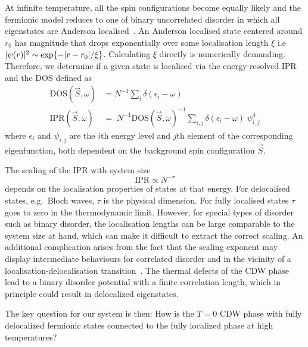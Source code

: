 At infinite temperature, all the spin configurations become equally likely and the fermionic model reduces to one of binary uncorrelated disorder in which all eigenstates are Anderson localised~\autocite{abrahamsScalingTheoryLocalization1979}. An Anderson localised state centered around \(r_0\) has magnitude that drops exponentially over some localisation length \(\xi\) i.e \(|\psi(r)|^2 \sim \exp{-\abs{r - r_0}/\xi}\). Calculating \(\xi\) directly is numerically demanding. Therefore, we determine if a given state is localised via the energy-resolved {IPR} and the {DOS} defined as \[\begin{aligned}
\mathrm{DOS}(\vec{S}, \omega)& = N^{-1} \sum_{i} \delta(\epsilon_i - \omega)\\
\mathrm{IPR}(\vec{S}, \omega)& = \; N^{-1} \mathrm{DOS}(\vec{S}, \omega)^{-1} \sum_{i,j} \delta(\epsilon_i - \omega)\;\psi^{4}_{i,j}\end{aligned}\] where \(\epsilon_i\) and \(\psi_{i,j}\) are the \(i\)th energy level and \(j\)th element of the corresponding eigenfunction, both dependent on the background spin configuration \(\vec{S}\).

The scaling of the IPR with system size \[\mathrm{IPR} \propto N^{-\tau}\] depends on the localisation properties of states at that energy. For delocalised states, e.g.~Bloch waves, \(\tau\) is the physical dimension. For fully localised states \(\tau\) goes to zero in the thermodynamic limit. However, for special types of disorder such as binary disorder, the localisation lengths can be large comparable to the system size at hand, which can make it difficult to extract the correct scaling. An additional complication arises from the fact that the scaling exponent may display intermediate behaviours for correlated disorder and in the vicinity of a localisation-delocalisation transition~\autocite{kramerLocalizationTheoryExperiment1993,eversAndersonTransitions2008a}. The thermal defects of the CDW phase lead to a binary disorder potential with a finite correlation length, which in principle could result in delocalized eigenstates.

The key question for our system is then: How is the \(T=0\) CDW phase with fully delocalized fermionic states connected to the fully localized phase at high temperatures?

